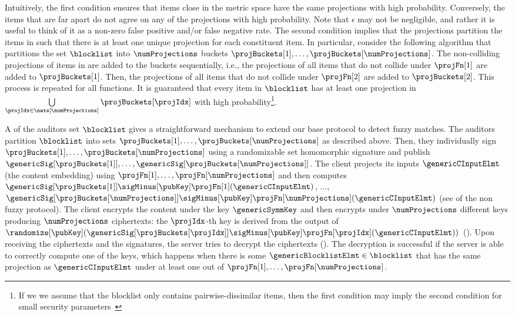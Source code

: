 Intuitively, the first condition ensures that items close in the metric space have the same projections 
with high probability. Conversely, the items that are far apart do not agree 
on any of the projections with high probability. Note that $\epsilon$ may not be negligible, and 
rather it is useful to think of it as a non-zero false positive and/or false negative rate. 
The second condition implies that the 
projections partition the items in \blocklist such that there is at least one unique projection for each 
constituent item. In particular, consider the following algorithm that partitions the set $\blocklist$
into $\numProjections$ buckets $\projBuckets[1], 
\dots, \projBuckets[\numProjections]$. The non-colliding projections of items in \blocklist are added 
to the buckets sequentially, i.e., the projections of all items that do not collide under $\projFn[1]$ are 
added to $\projBuckets[1]$. Then, the projections of all items that do not collide under $\projFn[2]$ 
are added to $\projBuckets[2]$. This process 
is repeated for all \numProjections functions. It is guaranteed that every item in $\blocklist$ has 
at least one projection in 
$\bigcup\limits_{\projIdx \in \nats[\numProjections]} \projBuckets[\projIdx]$ with high 
probability\footnote{If we we assume that the blocklist only contains pairwise-dissimilar items, then 
the first condition may imply the second condition for small security 
parameters~\cite{chongchitmate2024approximate}}. 

%
A \projectionPrimitive of the auditors set $\blocklist$ gives a straightforward mechanism to extend 
our base protocol to detect fuzzy matches. The auditors partition $\blocklist$ into sets 
$\projBuckets[1], \dots, \projBuckets[\numProjections]$ as described above. Then, they  
individually sign $\projBuckets[1], \dots, \projBuckets[\numProjections]$ using a randomizable 
set homomorphic signature and publish $\genericSig[\projBuckets[1]], \dots, 
\genericSig[\projBuckets[\numProjections]]$. The client projects its inputs 
$\genericCInputElmt$ (the content embedding)
using $\projFn[1], \dots, \projFn[\numProjections]$ and then computes 
$\genericSig[\projBuckets[1]] \sigMinus[\pubKey]\projFn[1](\genericCInputElmt)$, $\dots$, 
$\genericSig[\projBuckets[\numProjections]] 
\sigMinus[\pubKey]\projFn[\numProjections](\genericCInputElmt)$
(see  of the non fuzzy protocol). 
The client encrypts the content under the key $\genericSymmKey$ and then encrypts 
\genericSymmKey under $\numProjections$ different keys 
producing $\numProjections$ ciphertexts: the $\projIdx$-th key is derived from the output of 
$\randomize[\pubKey](\genericSig[\projBuckets[\projIdx]] 
\sigMinus[\pubKey]\projFn[\projIdx](\genericCInputElmt))$
(). Upon receiving the ciphertexts and the signatures, the server tries to 
decrypt the ciphertexts ().  The decryption is 
successful if the server is able to correctly compute one of the keys, which happens when there is 
some $\genericBlocklistElmt \in \blocklist$ that has the same projection as $\genericCInputElmt$ 
under at least one out of $\projFn[1], \dots, \projFn[\numProjections]$. 


